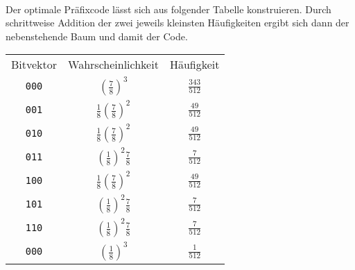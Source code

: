 \begin{flushenum}
\begin{flushalpha}
\begin{align*}
			\end{align*}
			Der optimale Präfixcode lässt sich aus folgender
			Tabelle konstruieren. Durch schrittweise Addition der
			zwei jeweils kleinsten Häufigkeiten ergibt sich dann
			der nebenstehende Baum und damit der Code.
			\begin{table}[!ht]
				\centering
			\begin{tabular}{c|c|c}
				Bitvektor & Wahrscheinlichkeit & Häufigkeit \\
				\verb|000|& $\left(\frac{7}{8}\right)^3$ & $\frac{343}{512}$ \\
				\verb|001|& $\frac{1}{8}\left(\frac{7}{8}\right)^2$ & $\frac{49}{512}$ \\
				\verb|010|& $\frac{1}{8}\left(\frac{7}{8}\right)^2$ & $\frac{49}{512}$ \\
				\verb|011|& $\left(\frac{1}{8}\right)^2\frac{7}{8}$ & $\frac{7}{512}$ \\
				\verb|100|& $\frac{1}{8}\left(\frac{7}{8}\right)^2$ & $\frac{49}{512}$ \\
				\verb|101|& $\left(\frac{1}{8}\right)^2\frac{7}{8}$ & $\frac{7}{512}$ \\
				\verb|110|& $\left(\frac{1}{8}\right)^2\frac{7}{8}$ & $\frac{7}{512}$ \\
				\verb|000|& $\left(\frac{1}{8}\right)^3$ & $\frac{1}{512}$
			\end{tabular}
			\end{table}
			
		\end{flushalpha}
\end{flushenum}
